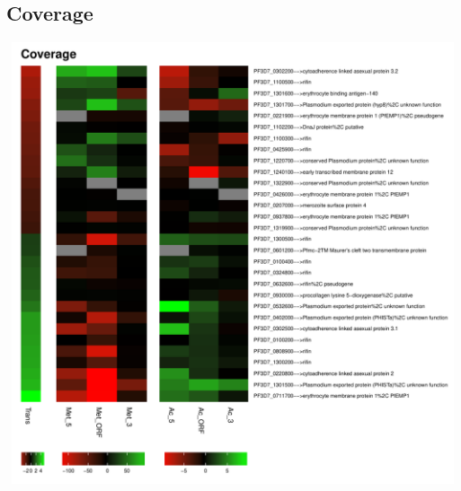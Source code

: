 \documentclass{article}\usepackage[]{graphicx}\usepackage[]{color}
\newenvironment{knitrout}{}{} %
\begin{document}
\subsection{Coverage}
\begin{knitrout}
\color{fgcolor}

{\centering \includegraphics[width=20cm,height=13cm]{figure/minimal-trans_cov-1} 

}



\end{knitrout}
\clearpage
\end{document}
